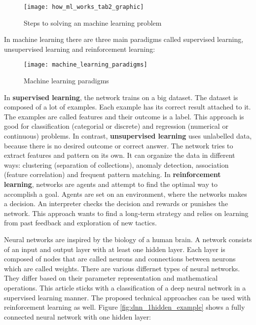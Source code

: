 \begin{figure}[H]
    \centering
    \texttt{[image: how\_ml\_works\_tab2\_graphic]}
    \caption{\cite{tf_ml_steps_pipline} Steps to solving an machine learning problem}
    \label{fig:ml_steps_pipeline}
\end{figure}

In machine learning there are three main paradigms called supervised learning, unsupervised learning and reinforcement learning:

\begin{figure}[H]
    \centering
    \texttt{[image: machine\_learning\_paradigms]}
    \caption{\cite{ml_paradigms_image} Machine learning paradigms}
    \label{fig:ml_paradigms_image}
\end{figure}

In \textbf{supervised learning}, the network trains on a big dataset.
The dataset is composed of a lot of examples.
Each example has its correct result attached to it.
The examples are called features and their outcome is a label.
This approach is good for classification (categorial or discrete) and regression (numerical or continuous) problems.
\cite{nvidia_paradigms_blog}
\hfill \break
In contrast, \textbf{unsupervised learning} uses unlabelled data, because there is no desired outcome or correct answer.
The network tries to extract features and pattern on its own.
It can organize the data in different ways: clustering (separation of collections), anomaly detection, association
(feature correlation) and frequent pattern matching.
\cite{nvidia_paradigms_blog}
\hfill \break
In \textbf{reinforcement learning}, networks are agents and attempt to find the optimal way to accomplish a goal.
Agents are set on an environment, where the networks makes a decision.
An interpreter checks the decision and rewards or punishes the network.
This approach wants to find a long-term strategy and relies on learning from past feedback and exploration of new tactics.
\cite{nvidia_paradigms_blog}

Neural networks are inspired by the biology of a human brain.
A network consists of an input and output layer with at least one hidden layer.
Each layer is composed of nodes that are called neurons and connections between neurons which are called weights.
There are various differnet types of neural networks.
They differ based on their parameter representation and mathematical operations.
This article sticks with a classification of a deep neural network in a supervised learning manner.
The proposed technical approaches can be used with reinforcement learning as well.
Figure \ref{fig:dnn_1hidden_example} shows a fully connected neural network with one hidden layer:
\cite{nvidia-ai-explained, tensorflow-about}

